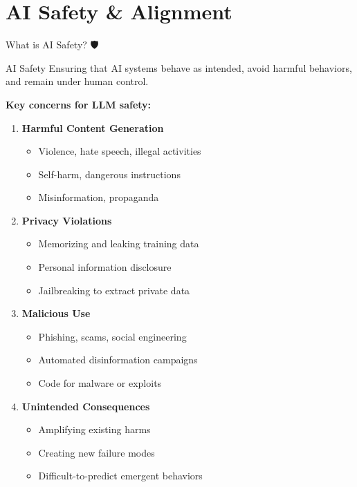 \documentclass[aspectratio=169]{beamer}
\begin{document}
\section{AI Safety \& Alignment}

\begin{frame}[shrink=10]{What is AI Safety? 🛡️}
\small
\begin{block}{AI Safety}
Ensuring that AI systems behave as intended, avoid harmful behaviors, and remain under human control.
\end{block}

\vspace{0.5em}

\textbf{Key concerns for LLM safety:}

\begin{enumerate}\setlength{\itemsep}{0pt}
    \item \textbf{Harmful Content Generation}
    \begin{itemize}\setlength{\itemsep}{0pt}
        \item Violence, hate speech, illegal activities
        \item Self-harm, dangerous instructions
        \item Misinformation, propaganda
    \end{itemize}

    \item \textbf{Privacy Violations}
    \begin{itemize}\setlength{\itemsep}{0pt}
        \item Memorizing and leaking training data
        \item Personal information disclosure
        \item Jailbreaking to extract private data
    \end{itemize}

    \item \textbf{Malicious Use}
    \begin{itemize}\setlength{\itemsep}{0pt}
        \item Phishing, scams, social engineering
        \item Automated disinformation campaigns
        \item Code for malware or exploits
    \end{itemize}

    \item \textbf{Unintended Consequences}
    \begin{itemize}\setlength{\itemsep}{0pt}
        \item Amplifying existing harms
        \item Creating new failure modes
        \item Difficult-to-predict emergent behaviors
    \end{itemize}
\end{enumerate}
\end{frame}
\end{document}
